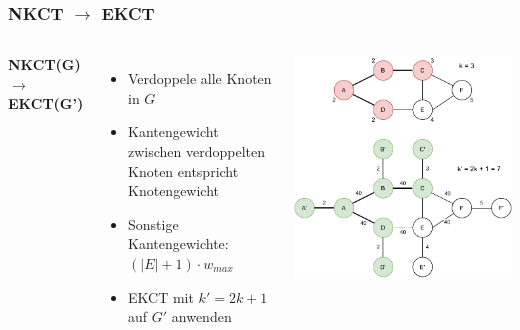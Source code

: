 \documentclass[aspectratio=169]{beamer}
\begin{document}
\begin{frame}
\frametitle{NKCT $\rightarrow$ EKCT}
\begin{columns}[c] %
	
	\textbf{NKCT(G) $\rightarrow$ EKCT(G')}
	\begin{itemize}
		\item Verdoppele alle Knoten in $G$
		\item Kantengewicht zwischen verdoppelten Knoten entspricht Knotengewicht
		\item Sonstige Kantengewichte: $(|E|+1)\cdot w_{max}$
		\item EKCT mit $k' = 2k + 1$ auf $G'$ anwenden
	\end{itemize}
	\includegraphics[scale=.6]{nekctk.pdf}
	
	
\end{columns}
\end{frame}
\end{document}
